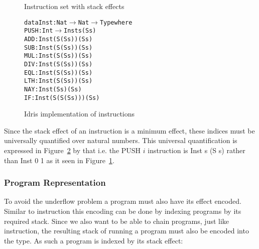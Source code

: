 \begin{figure}
\caption{Instruction set with stack effects}
\label{fig:inst_set_with_effect}
\end{figure}

\begin{figure}
\begin{alltt}
data Inst : Nat \(\rightarrow\) Nat \(\rightarrow\) Type where
  PUSH : Int \(\rightarrow\) Inst          s    (S s)
  ADD  :        Inst    (S (S s))  (S s)
  SUB  :        Inst    (S (S s))  (S s)
  MUL  :        Inst    (S (S s))  (S s)
  DIV  :        Inst    (S (S s))  (S s)
  EQL  :        Inst    (S (S s))  (S s)
  LTH  :        Inst    (S (S s))  (S s)
  NAY  :        Inst       (S s)   (S s)
  IF   :        Inst (S (S (S s))) (S s)
\end{alltt}
\caption{Idris implementation of instructions}
\label{fig:idris_inst_set}
\end{figure}

Since the stack effect of an instruction is a minimum effect, these indices must be universally quantified over natural numbers. This universal quantification is expressed in Figure~\ref{fig:idris_inst_set} by that i.e. the PUSH $i$ instruction is Inst s (S s) rather than Inst 0 1 as it seen in Figure~\ref{fig:inst_set_with_effect}. 

\subsubsection{Program Representation}
To avoid the underflow problem a program must also have its effect encoded. Similar to instruction this encoding can be done by indexing programs by its required stack. Since we also want to be able to chain programs, just like instruction, the resulting stack of running a program must also be encoded into the type. As such a program is indexed by its stack effect:


